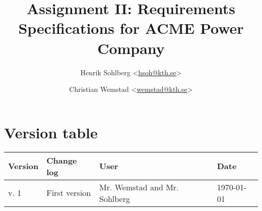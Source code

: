 \documentclass[a4paper]{article}
\title{Assignment II: Requirements Specifications for ACME Power Company}
\author{Henrik Sohlberg <\href{mailto:hsoh@kth.se}{hsoh@kth.se}> %
\and Christian Wemstad <\href{mailto:wemstad@kth.se}{wemstad@kth.se}> %
}
\begin{document}
\thispagestyle{empty}
\maketitle
\thispagestyle{empty}
\pagestyle{empty}
\newpage
\section*{Version table}
\label{sec:version_tabel}
\begin{table}[H]
	\centering
	\begin{tabular}{|l|l|l|l|}
		\hline
			\textbf{Version} & \textbf{Change log} & \textbf{User} & \textbf{Date}\\
		\hline
		     v. 1 & First version & Mr. Wemstad and Mr. Sohlberg & \today \\
		\hline
	\end{tabular}
\end{table}
\newpage       
\tableofcontents
\newpage
\pagestyle{fancy}
\setcounter{page}{1}










\clearpage


\clearpage


 
\end{document}

